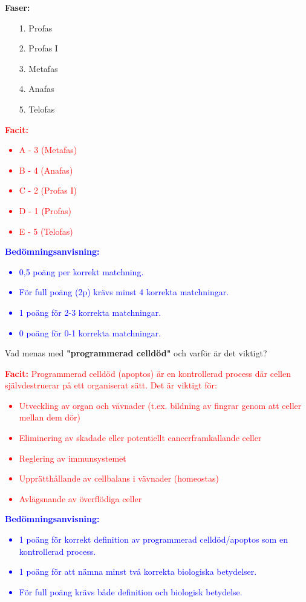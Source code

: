 \documentclass{exam}
\newcommand{\facit}[1]{\textcolor{red}{\textbf{Facit:} #1}}
\newcommand{\bedomning}[1]{\textcolor{blue}{\textbf{Bedömningsanvisning:} #1}}
\begin{document}
\begin{questions}
\textbf{Faser:}
\begin{itemize}
  \item[1.] Profas
  \item[2.] Profas I
  \item[3.] Metafas
  \item[4.] Anafas
  \item[5.] Telofas
\end{itemize}

\facit{
\begin{itemize}
  \item A - 3 (Metafas)
  \item B - 4 (Anafas)
  \item C - 2 (Profas I)
  \item D - 1 (Profas)
  \item E - 5 (Telofas)
\end{itemize}
}

\bedomning{
\begin{itemize}
  \item 0,5 poäng per korrekt matchning.
  \item För full poäng (2p) krävs minst 4 korrekta matchningar.
  \item 1 poäng för 2-3 korrekta matchningar.
  \item 0 poäng för 0-1 korrekta matchningar.
\end{itemize}
}
\vspace{5mm}

\question Vad menas med \textbf{"programmerad celldöd"} och varför är det viktigt?
\vspace{5mm}

\facit{
Programmerad celldöd (apoptos) är en kontrollerad process där cellen självdestruerar på ett organiserat sätt. Det är viktigt för:
\begin{itemize}
  \item Utveckling av organ och vävnader (t.ex. bildning av fingrar genom att celler mellan dem dör)
  \item Eliminering av skadade eller potentiellt cancerframkallande celler
  \item Reglering av immunsystemet
  \item Upprätthållande av cellbalans i vävnader (homeostas)
  \item Avlägsnande av överflödiga celler
\end{itemize}
}

\bedomning{
\begin{itemize}
  \item 1 poäng för korrekt definition av programmerad celldöd/apoptos som en kontrollerad process.
  \item 1 poäng för att nämna minst två korrekta biologiska betydelser.
  \item För full poäng krävs både definition och biologisk betydelse.
\end{itemize}
}
\vspace{10mm}


\end{questions}
\end{document}
